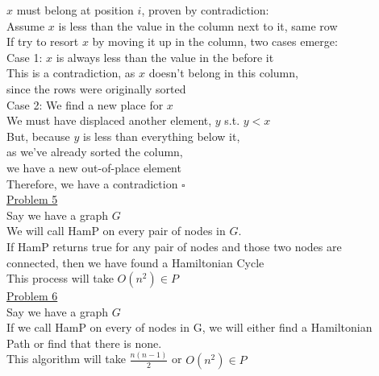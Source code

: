 \documentclass[12pt]{article}
\begin{document}
\indent\indent $x$ must belong at position $i$, proven by contradiction:\\
\indent\indent\indent Assume $x$ is less than the value in the column next to it, same row\\
\indent\indent\indent If try to resort $x$ by moving it up in the column, two cases emerge:\\
\indent\indent\indent Case 1: $x$ is always less than the value in the before it\\
\indent\indent\indent\indent This is a contradiction, as $x$ doesn't belong in this column,\\
\indent\indent\indent\indent since the rows were originally sorted\\
\indent\indent\indent Case 2: We find a new place for $x$\\
\indent\indent\indent\indent We must have displaced another element, $y$ s.t. $y < x$\\
\indent\indent\indent\indent But, because $y$ is less than everything below it,\\ 
\indent\indent\indent\indent\indent as we've already sorted the column,\\ 
\indent\indent\indent\indent\indent we have a new out-of-place element\\
\indent\indent\indent\indent Therefore, we have a contradiction $\square$\\
\underline{Problem 5}\\
Say we have a graph $G$\\
We will call HamP on every pair of nodes in $G$.\\
If HamP returns true for any pair of nodes and those two nodes are\\
\indent connected, then we have found a Hamiltonian Cycle\\
This process will take $O(n^2) \in P$\\
\underline{Problem 6}\\
Say we have a graph $G$\\
If we call HamP on every of nodes in G, we will either find a Hamiltonian\\ 
\indent Path or find that there is none.\\
This algorithm will take $\frac{n(n-1)}{2}$  or $O(n^2) \in P$
\end{document}
